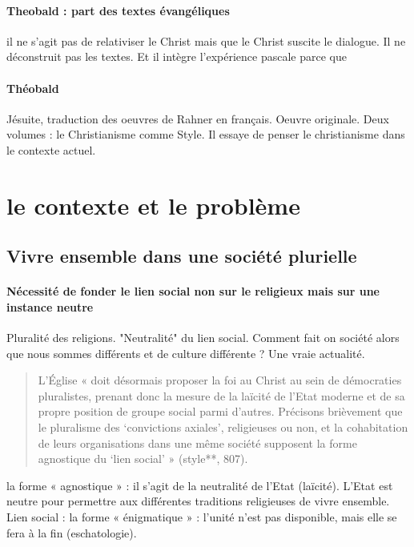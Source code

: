 \paragraph{Theobald : part des textes évangéliques} il ne s'agit pas de relativiser le Christ mais que le Christ suscite le dialogue. Il ne déconstruit pas les textes. Et il intègre l'expérience pascale parce que 

\paragraph{Théobald} Jésuite, traduction des oeuvres de Rahner en français. Oeuvre originale. Deux volumes : le Christianisme comme Style. Il essaye de penser le christianisme dans le contexte actuel.


\section{le contexte et le problème}


\subsection{Vivre ensemble dans une société plurielle}

\paragraph{Nécessité de fonder le lien social non sur le religieux mais sur une instance neutre} Pluralité des religions. "Neutralité" du lien social. Comment fait on société alors que nous sommes différents et de culture différente ? Une vraie actualité. 
\begin{quote}
    L’Église « doit désormais proposer la foi au Christ au sein de démocraties pluralistes, prenant donc la mesure de la laïcité de l’Etat moderne et de sa propre position de groupe social parmi d’autres. Précisons brièvement que le pluralisme des ‘convictions axiales’, religieuses ou non, et la cohabitation de leurs organisations dans une même société supposent la forme agnostique du  ‘lien social’ » (style**, 807).
\end{quote}
\begin{Def}
la forme « agnostique » : il s’agit de la neutralité de l’Etat (laïcité). L’Etat est
neutre pour permettre aux différentes traditions religieuses de vivre ensemble.
Lien social : la forme « énigmatique » : l’unité n’est pas disponible, mais elle se fera à la fin
(eschatologie).
\end{Def}
 
